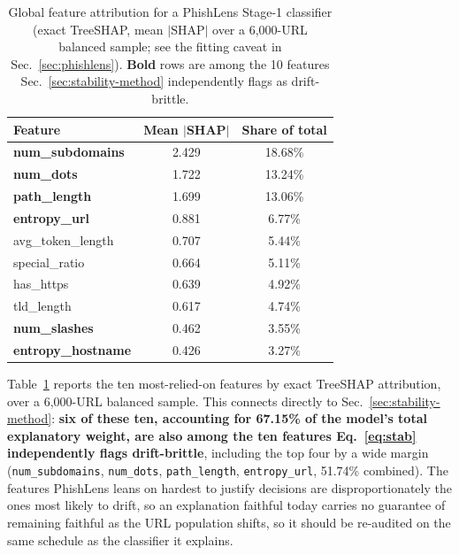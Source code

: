 \documentclass[conference]{IEEEtran}
\begin{document}
\begin{table}[t]
\caption{Global feature attribution for a PhishLens Stage-1 classifier
(exact TreeSHAP, mean $|\mathrm{SHAP}|$ over a 6{,}000-URL balanced
sample; see the fitting caveat in Sec.~\ref{sec:phishlens}). \textbf{Bold}
rows are among the 10 features Sec.~\ref{sec:stability-method}
independently flags as drift-brittle.}
\label{tab:shap-global}
\centering\footnotesize
\begin{tabular}{@{}lcc@{}}
\toprule
\textbf{Feature} & \textbf{Mean $|$SHAP$|$} & \textbf{Share of total}\\
\midrule
\textbf{num\_subdomains}   & 2.429 & 18.68\%\\
\textbf{num\_dots}         & 1.722 & 13.24\%\\
\textbf{path\_length}      & 1.699 & 13.06\%\\
\textbf{entropy\_url}      & 0.881 & 6.77\%\\
avg\_token\_length         & 0.707 & 5.44\%\\
special\_ratio             & 0.664 & 5.11\%\\
has\_https                  & 0.639 & 4.92\%\\
tld\_length                 & 0.617 & 4.74\%\\
\textbf{num\_slashes}      & 0.462 & 3.55\%\\
\textbf{entropy\_hostname} & 0.426 & 3.27\%\\
\bottomrule
\end{tabular}
\end{table}

Table~\ref{tab:shap-global} reports the ten most-relied-on features by
exact TreeSHAP attribution, over a 6{,}000-URL balanced sample. This
connects directly to Sec.~\ref{sec:stability-method}: \textbf{six of
these ten, accounting for 67.15\% of the model's total explanatory
weight, are also among the ten features Eq.~\eqref{eq:stab} independently flags drift-brittle}, including the top four by a wide
margin
(\texttt{num\_subdomains}, \texttt{num\_dots}, \texttt{path\_length},
\texttt{entropy\_url}, 51.74\% combined). The features PhishLens leans on
hardest to justify decisions are disproportionately the ones most likely
to drift, so an explanation faithful today carries no guarantee of
remaining faithful as the URL population shifts, so it should be
re-audited on the same schedule as the classifier it explains.
\end{document}
